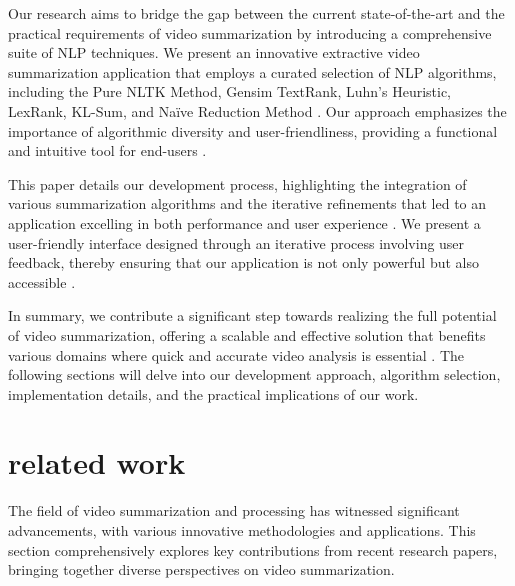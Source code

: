 \documentclass{ieeeaccess}
\begin{document}
Our research aims to bridge the gap between the current state-of-the-art and the practical requirements of video summarization by introducing a comprehensive suite of NLP techniques. We present an innovative extractive video summarization application that employs a curated selection of NLP algorithms, including the Pure NLTK Method, Gensim TextRank, Luhn's Heuristic, LexRank, KL-Sum, and Naïve Reduction Method \cite{ref6}. Our approach emphasizes the importance of algorithmic diversity and user-friendliness, providing a functional and intuitive tool for end-users \cite{ref2}.

This paper details our development process, highlighting the integration of various summarization algorithms and the iterative refinements that led to an application excelling in both performance and user experience \cite{ref1}. We present a user-friendly interface designed through an iterative process involving user feedback, thereby ensuring that our application is not only powerful but also accessible \cite{ref8}.

In summary, we contribute a significant step towards realizing the full potential of video summarization, offering a scalable and effective solution that benefits various domains where quick and accurate video analysis is essential \cite{ref5}. The following sections will delve into our development approach, algorithm selection, implementation details, and the practical implications of our work.


\section{related work}
\label{related_work}
The field of video summarization and processing has witnessed significant advancements, with various innovative methodologies and applications. This section comprehensively explores key contributions from recent research papers, bringing together diverse perspectives on video summarization.
\end{document}
